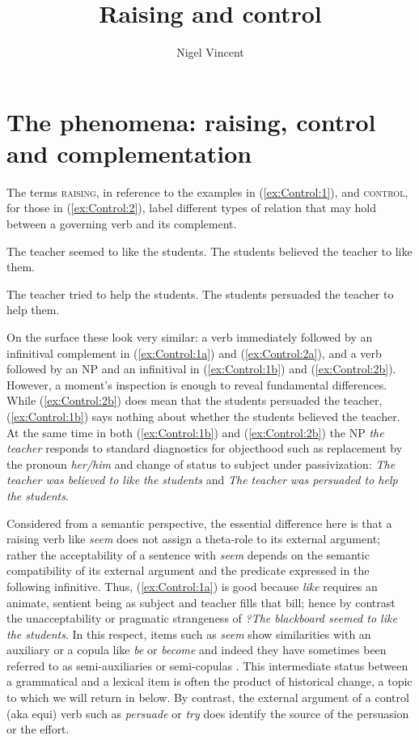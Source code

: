 \documentclass[output=paper,hidelinks]{langscibook}
\title{Raising and control}
\author{Nigel Vincent\affiliation{The University of Manchester}}
\begin{document}
\maketitle
\label{chap:Control}

\section{The phenomena: raising, control and complementation}
\label{sec:Control:1}

The terms \textsc{raising}, in reference to the examples in (\ref{ex:Control:1}), and \textsc{control}, for those in (\ref{ex:Control:2}), label different types of relation that may hold between a governing verb and its complement.


\ea\label{ex:Control:1}
\ea\label{ex:Control:1a} The teacher seemed to like the students.
\ex\label{ex:Control:1b} The students believed the teacher to like them.
\z\z

\ea\label{ex:Control:2}
\ea\label{ex:Control:2a} The teacher tried to help the students.
\ex\label{ex:Control:2b} The students persuaded the teacher to help them.
\z\z

On the surface these look very similar: a verb immediately followed by an infinitival complement in (\ref{ex:Control:1a}) and (\ref{ex:Control:2a}), and a verb followed by an NP and an infinitival in (\ref{ex:Control:1b}) and (\ref{ex:Control:2b}). However, a moment's inspection is enough to reveal fundamental differences. While (\ref{ex:Control:2b}) does mean that the students persuaded the teacher, (\ref{ex:Control:1b}) says nothing about whether the students believed the teacher. At the same time in both (\ref{ex:Control:1b}) and (\ref{ex:Control:2b}) the NP \emph{the teacher} responds to standard diagnostics for objecthood such as replacement by the pronoun \emph{her/him} and change of status to subject under passivization: \emph{The teacher was believed to like the students} and \emph{The teacher was persuaded to help the students}.

Considered from a semantic perspective, the essential difference here is that a raising verb like \emph{seem} does not assign a theta-role to its external argument; rather the acceptability of a sentence with \emph{seem} depends on the semantic compatibility of its external argument and the predicate expressed in the following infinitive. Thus, (\ref{ex:Control:1a}) is good because \emph{like} requires an animate, sentient being as subject and teacher fills that bill; hence by contrast the unacceptability or pragmatic strangeness of \emph{?The blackboard seemed to like the students}. In this respect, items such as \emph{seem} show similarities with an auxiliary or a copula like \emph{be} or \emph{become} and indeed they have sometimes been referred to as semi-auxiliaries or semi-copulas \citep[5--6]{Pustet2003}. This intermediate status between a grammatical and a lexical item is often the product of historical change, a topic to which we will return in  below. By contrast, the external argument of a control (aka equi) verb such as \emph{persuade} or \emph{try} does identify the source of the persuasion or the effort.
\end{document}
